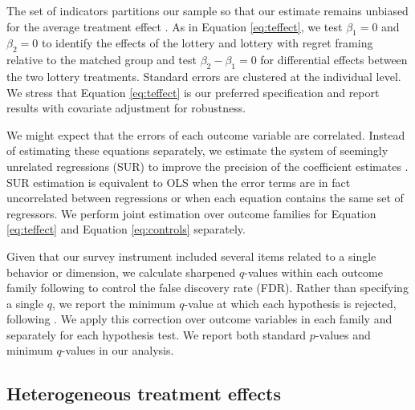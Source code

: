 \documentclass[12pt]{article}
\begin{document}
		The set of indicators partitions our sample so that our estimate remains unbiased for the average treatment effect . As in Equation \ref{eq:teffect}, we test $\beta_{1} = 0$ and $\beta_{2} = 0$ to identify the effects of the lottery and lottery with regret framing relative to the matched group and test $\beta_{2} - \beta_{1} = 0$ for differential effects between the two lottery treatments. Standard errors are clustered at the individual level. We stress that Equation \ref{eq:teffect} is our preferred specification and report results with covariate adjustment for robustness.

		We might expect that the errors of each outcome variable are correlated. Instead of estimating these equations separately, we estimate the system of seemingly unrelated regressions (SUR) to improve the precision of the coefficient estimates . SUR estimation is equivalent to OLS when the error terms are in fact uncorrelated between regressions or when each equation contains the same set of regressors. We perform joint estimation over outcome families for Equation \ref{eq:teffect} and Equation \ref{eq:controls} separately.

		Given that our survey instrument included several items related to a single behavior or dimension, we calculate sharpened $q$-values within each outcome family following  to control the false discovery rate (FDR). Rather than specifying a single $q$, we report the minimum $q$-value at which each hypothesis is rejected, following . We apply this correction over outcome variables in each family and separately for each hypothesis test. We report both standard $p$-values and minimum $q$-values in our analysis.


	\subsection{Heterogeneous treatment effects}
\end{document}
